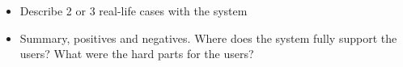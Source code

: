 \begin{itemize}
	\item Describe 2 or 3 real-life cases with the system
	\item Summary, positives and negatives. Where does the system fully support the users? What were the hard parts for the users?
\end{itemize}